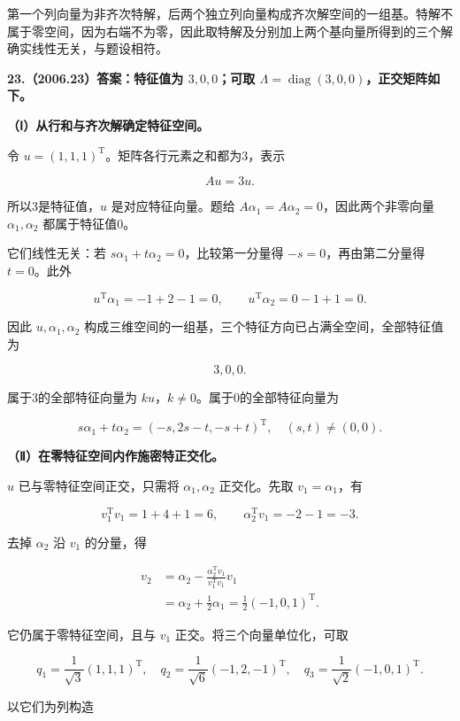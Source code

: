 \documentclass[UTF8,11pt,fontset=windows]{ctexart}
\begin{document}
第一个列向量为非齐次特解，后两个独立列向量构成齐次解空间的一组基。特解不属于零空间，因为右端不为零，因此取特解及分别加上两个基向量所得到的三个解确实线性无关，与题设相符。

\clearpage

\textbf{23.（2006.23）答案：特征值为 $3,0,0$；可取 $\Lambda=\operatorname{diag}(3,0,0)$，正交矩阵如下。}

\textbf{（Ⅰ）从行和与齐次解确定特征空间。}

令 $u=(1,1,1)^{\mathrm T}$。矩阵各行元素之和都为3，表示

$$
Au=3u.
$$

所以3是特征值，$u$ 是对应特征向量。题给 $A\alpha_1=A\alpha_2=0$，因此两个非零向量 $\alpha_1,\alpha_2$ 都属于特征值0。

它们线性无关：若 $s\alpha_1+t\alpha_2=0$，比较第一分量得 $-s=0$，再由第二分量得 $t=0$。此外

$$
u^{\mathrm T}\alpha_1=-1+2-1=0,
\qquad
u^{\mathrm T}\alpha_2=0-1+1=0.
$$

因此 $u,\alpha_1,\alpha_2$ 构成三维空间的一组基，三个特征方向已占满全空间，全部特征值为

$$
\boxed{3,0,0.}
$$

属于3的全部特征向量为 $ku$，$k\ne0$。属于0的全部特征向量为

$$
\boxed{s\alpha_1+t\alpha_2
=(-s,2s-t,-s+t)^{\mathrm T},\quad(s,t)\ne(0,0).}
$$

\textbf{（Ⅱ）在零特征空间内作施密特正交化。}

$u$ 已与零特征空间正交，只需将 $\alpha_1,\alpha_2$ 正交化。先取 $v_1=\alpha_1$，有

$$
v_1^{\mathrm T}v_1=1+4+1=6,
\qquad\alpha_2^{\mathrm T}v_1=-2-1=-3.
$$

去掉 $\alpha_2$ 沿 $v_1$ 的分量，得

$$
\begin{aligned}
v_2&=\alpha_2-
\frac{\alpha_2^{\mathrm T}v_1}{v_1^{\mathrm T}v_1}v_1\\
&=\alpha_2+\frac12\alpha_1
=\frac12(-1,0,1)^{\mathrm T}.
\end{aligned}
$$

它仍属于零特征空间，且与 $v_1$ 正交。将三个向量单位化，可取

$$
q_1=\frac1{\sqrt3}(1,1,1)^{\mathrm T},
\quad q_2=\frac1{\sqrt6}(-1,2,-1)^{\mathrm T},
\quad q_3=\frac1{\sqrt2}(-1,0,1)^{\mathrm T}.
$$

以它们为列构造
\end{document}
